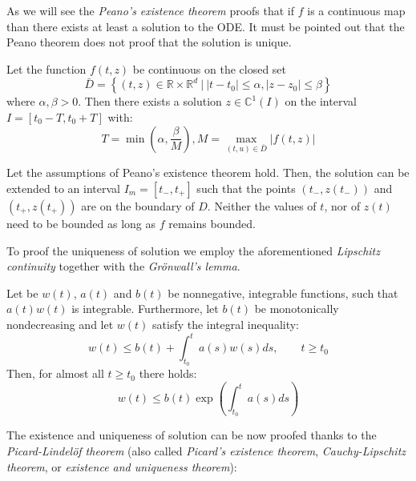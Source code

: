 As we will see the \textit{Peano's existence theorem} proofs that if $f$ is a continuous map than there exists at least a solution to the ODE. It must be pointed out that the Peano theorem does not proof that the solution is unique.

\begin{theorem}
	Let the function $f(t,z)$ be continuous on the closed set
	\begin{equation}
	\bar{D} = \left\lbrace (t,z) \in \mathbb{R} \times \mathbb{R}^d ~\big|~ |t-t_0|\leq\alpha, |z-z_0|\leq\beta \right\rbrace
	\end{equation}
	where $\alpha,\beta > 0$. Then there exists a solution $z \in \mathbb{C}^1(I)$ on the interval $I = \left[ t_0-T, t_0+T \right]$ with:
	\begin{equation}
		T = \min \left(\alpha, \dfrac{\beta}{M} \right), M = \max_{(t,u)\in\bar{D}}|f(t,z)|
	\end{equation}
\end{theorem}

\begin{theorem}
	Let the assumptions of Peano's existence theorem hold. Then, the solution can be	extended to an interval $I_m = [t_-, t_+]$ such that the points $(t_-,z(t_-))$ and $(t_+, z(t_+))$ are on the boundary of $D$. Neither the values of $t$, nor of $z(t)$ need to be bounded as long as $f$ remains bounded.
\end{theorem}

To proof the uniqueness of solution we employ the aforementioned \textit{Lipschitz continuity} together with the \textit{Gr\"onwall's lemma}.

\begin{lemma}
	Let be $w(t)$, $a(t)$ and $b(t)$ be nonnegative, integrable functions, such that $a(t)w(t)$ is integrable. Furthermore, let $b(t)$ be monotonically nondecreasing and let $w(t)$ satisfy the integral inequality:
	\begin{equation}
		w(t) \leq b(t) + \int_{t_0}^{t} a(s)w(s)ds, \qquad t \geq t_0
	\end{equation}
	Then, for almost all $t \geq t_0$ there holds:
	\begin{equation}
		w(t) \leq b(t)\exp\left( \int_{t_0}^{t} a(s)ds\right) 
	\end{equation}
\end{lemma}

The existence and uniqueness of solution can be now proofed thanks to the \textit{Picard-Lindel\"of theorem} (also called \textit{Picard's existence theorem}, \textit{Cauchy-Lipschitz theorem}, or \textit{existence and uniqueness theorem}):


